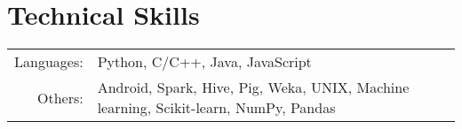 \section{Technical Skills}
\renewcommand{\arraystretch}{1}%
\begin{tabular}{rl}

Languages: &  Python, C/C++, Java, JavaScript  \\
Others: & Android, Spark, Hive, Pig, Weka, UNIX, Machine learning, Scikit-learn, NumPy, Pandas \\
\end{tabular}
\vspace{5pt}